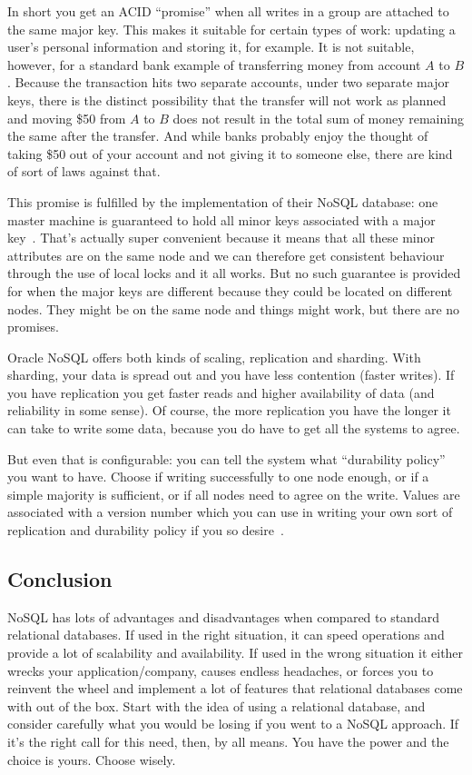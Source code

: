 \documentclass[a4paper]{report}
\begin{document}
In short you get an ACID ``promise'' when all writes in a group are attached to the same major key. This makes it suitable for certain types of work: updating a user's personal information and storing it, for example. It is not suitable, however, for a standard bank example of transferring money from account $A$ to $B$. Because the transaction hits two separate accounts, under two separate major keys, there is the distinct possibility that the transfer will not work as planned and moving \$50 from $A$ to $B$ does not result in the total sum of money remaining the same after the transfer. And while banks probably enjoy the thought of taking \$50 out of your account and not giving it to someone else, there are kind of sort of laws against that.


This promise is fulfilled by the implementation of their NoSQL database: one master machine is guaranteed to hold all minor keys associated with a major key~\cite{oraclenosql}. That's actually super convenient because it means that all these minor attributes are on the same node and we can therefore get consistent behaviour through the use of local locks and it all works. But no such guarantee is provided for when the major keys are different because they could be located on different nodes. They might be on the same node and things might work, but there are no promises. 

Oracle NoSQL offers both kinds of scaling, replication and sharding. With sharding, your data is spread out and you have less contention (faster writes). If you have replication you get faster reads and higher availability of data (and reliability in some sense). Of course, the more replication you have the longer it can take to write some data, because you do have to get all the systems to agree. 

But even that is configurable: you can tell the system what ``durability policy'' you want to have. Choose if writing successfully to one node enough, or if a simple majority is sufficient, or if all nodes need to agree on the write. Values are associated with a version number which you can use in writing your own sort of replication and durability policy if you so desire~\cite{oraclenosql}.

\subsection*{Conclusion}

NoSQL has lots of advantages and disadvantages when compared to standard relational databases. If used in the right situation, it can speed operations and provide a lot of scalability and availability. If used in the wrong situation it either wrecks your application/company, causes endless headaches, or forces you to reinvent the wheel and implement a lot of features that relational databases come with out of the box. Start with the idea of using a relational database, and consider carefully what you would be losing if you went to a NoSQL approach. If it's the right call for this need, then, by all means. You have the power and the choice is yours. Choose wisely.






\end{document}
